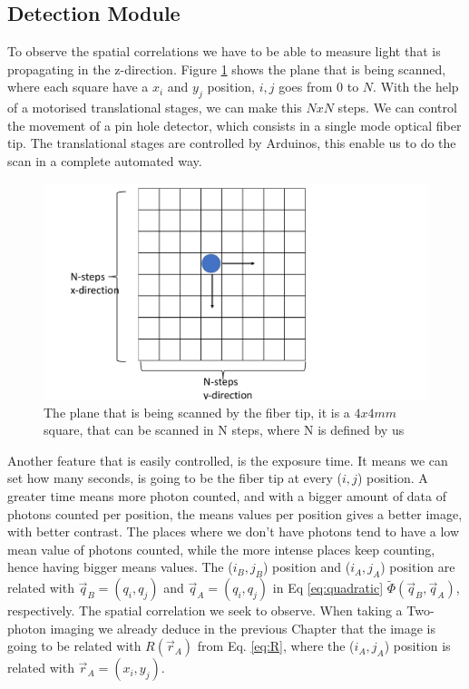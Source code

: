 \subsection{Detection Module}
To observe the spatial correlations we have to be able to measure light that is propagating
in the z-direction. Figure \ref{fig:scan} shows the plane that is being scanned, where each 
square have a $x_i$ and $y_j$ position, ${i,j}$ goes from $0$ to $N$. With the help of a motorised translational stages, we can make this $NxN$ steps. We can 
control the movement of a pin hole detector, which consists in a single mode optical fiber tip. The translational stages are controlled 
by Arduinos, this enable us to do the scan in a complete automated way.
\begin{figure}[h!]
\centering
\includegraphics[width=1\textwidth]{Figures/scan.pdf}
\caption{The plane that is being scanned by the fiber tip, it is a $4x4mm$ square, that
can be scanned in N steps, where N is defined by us} 
\label{fig:scan}
\end{figure}

Another feature that is easily controlled, is the exposure time. It means we can set how many seconds, is going to be the fiber tip at
every ($i,j$) position. A greater time means more photon counted, and with a bigger amount of data of photons
counted per position, the means values per position gives a better image, with better contrast. The places where we don't have photons 
tend to have a low mean value of photons counted, while the more intense places keep counting, hence having bigger means values.
The ($i_B,j_B$) position and ($i_A,j_A$) position are related with $\vec{q}_B=(q_i,q_j)$ and $\vec{q}_A=(q_i,q_j)$ in Eq \ref{eq:quadratic} 
$\tilde{\Phi}(\vec{q}_B,\vec{q}_A)$, respectively. The spatial correlation we seek to observe. When taking a Two-photon imaging we already deduce in the 
previous Chapter that the image is going to be related with $R(\vec{r}_A)$ from Eq. \ref{eq:R}, where the ($i_A,j_A$)
 position is related with $\vec{r}_A=(x_i,y_j)$.







